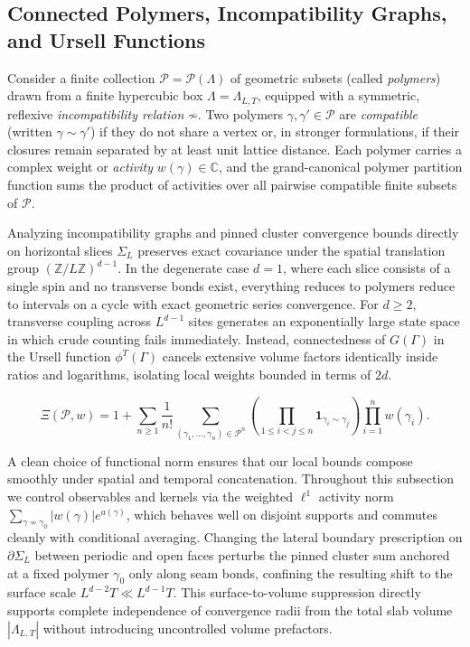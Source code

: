 \documentclass[11pt]{article}
\theoremstyle{definition}
\begin{document}
\subsection{Connected Polymers, Incompatibility Graphs, and Ursell Functions}
\label{subsec:s03a}

Consider a finite collection $\mathcal{P} = \mathcal{P}(\Lambda)$ of geometric
subsets (called \emph{polymers}) drawn from a finite hypercubic box $\Lambda =
\Lambda_{L,T}$, equipped with a symmetric, reflexive \emph{incompatibility relation}
$\not\sim$. Two polymers $\gamma, \gamma' \in \mathcal{P}$ are \emph{compatible}
(written $\gamma \sim \gamma'$) if they do not share a vertex or, in stronger
formulations, if their closures remain separated by at least unit lattice distance.
Each polymer carries a complex weight or \emph{activity} $w(\gamma) \in \mathbb{C}$,
and the grand-canonical polymer partition function sums the product of activities
over all pairwise compatible finite subsets of $\mathcal{P}$.

Analyzing incompatibility graphs and pinned cluster convergence bounds directly on
horizontal slices $\Sigma_L$ preserves exact covariance under the spatial
translation group $(\mathbb{Z}/L\mathbb{Z})^{d-1}$. In the degenerate case $d = 1$,
where each slice consists of a single spin and no transverse bonds exist, everything
reduces to polymers reduce to intervals on a cycle with exact geometric series
convergence. For $d \ge 2$, transverse coupling across $L^{d-1}$ sites generates an
exponentially large state space in which crude counting fails immediately. Instead,
connectedness of $G(\Gamma)$ in the Ursell function $\phi^T(\Gamma)$ cancels
extensive volume factors identically inside ratios and logarithms, isolating local
weights bounded in terms of $2d$.

\[
  \Xi(\mathcal{P}, w) = 1 + \sum_{n \ge 1} \frac{1}{n!} \sum_{(\gamma_1, \dots, \gamma_n) \in \mathcal{P}^n} \left(\prod_{1 \le i < j \le n} \mathbf{1}_{\gamma_i \sim \gamma_j}\right) \prod_{i=1}^n w(\gamma_i).
\]

A clean choice of functional norm ensures that our local bounds compose smoothly
under spatial and temporal concatenation. Throughout this subsection we control
observables and kernels via the weighted $\ell^1$ activity norm $\sum_{\gamma
\not\sim \gamma_0} |w(\gamma)| e^{a(\gamma)}$, which behaves well on disjoint
supports and commutes cleanly with conditional averaging. Changing the lateral
boundary prescription on $\partial \Sigma_L$ between periodic and open faces
perturbs the pinned cluster sum anchored at a fixed polymer $\gamma_0$ only along
seam bonds, confining the resulting shift to the surface scale $L^{d-2} T \ll
L^{d-1} T$. This surface-to-volume suppression directly supports complete
independence of convergence radii from the total slab volume $|\Lambda_{L,T}|$
without introducing uncontrolled volume prefactors.
\end{document}
